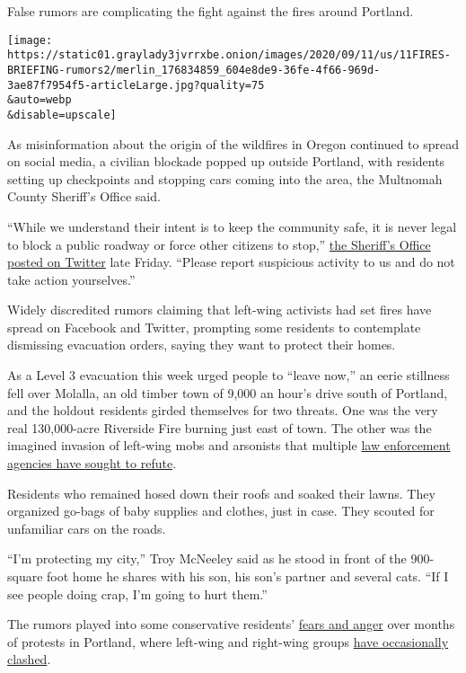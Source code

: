 False rumors are complicating the fight against the fires around
Portland.

\texttt{[image: https://static01.graylady3jvrrxbe.onion/images/2020/09/11/us/11FIRES-BRIEFING-rumors2/merlin\_176834859\_604e8de9-36fe-4f66-969d-3ae87f7954f5-articleLarge.jpg?quality=75\\\&auto=webp\\\&disable=upscale]}

As misinformation about the origin of the wildfires in Oregon continued
to spread on social media, a civilian blockade popped up outside
Portland, with residents setting up checkpoints and stopping cars coming
into the area, the Multnomah County Sheriff's Office said.

``While we understand their intent is to keep the community safe, it is
never legal to block a public roadway or force other citizens to stop,''
\href{https://twitter.com/MultCoSO/status/1304631505314930688}{the
Sheriff's Office posted on Twitter} late Friday. ``Please report
suspicious activity to us and do not take action yourselves.''

Widely discredited rumors claiming that left-wing activists had set
fires have spread on Facebook and Twitter, prompting some residents to
contemplate dismissing evacuation orders, saying they want to protect
their homes.

As a Level 3 evacuation this week urged people to ``leave now,'' an
eerie stillness fell over Molalla, an old timber town of 9,000 an hour's
drive south of Portland, and the holdout residents girded themselves for
two threats. One was the very real 130,000-acre Riverside Fire burning
just east of town. The other was the imagined invasion of left-wing mobs
and arsonists that multiple
\href{https://www.nytimes3xbfgragh.onion/2020/09/10/us/antifa-wildfires.html}{law
enforcement agencies have sought to refute}.

Residents who remained hosed down their roofs and soaked their lawns.
They organized go-bags of baby supplies and clothes, just in case. They
scouted for unfamiliar cars on the roads.

``I'm protecting my city,'' Troy McNeeley said as he stood in front of
the 900-square foot home he shares with his son, his son's partner and
several cats. ``If I see people doing crap, I'm going to hurt them.''

The rumors played into some conservative residents'
\href{https://www.nytimes3xbfgragh.onion/2020/09/05/us/portland-political-chasm-protests-unrest.html}{fears
and anger} over months of protests in Portland, where left-wing and
right-wing groups
\href{https://www.nytimes3xbfgragh.onion/2020/08/22/us/portland-protests.html}{have
occasionally clashed}.

